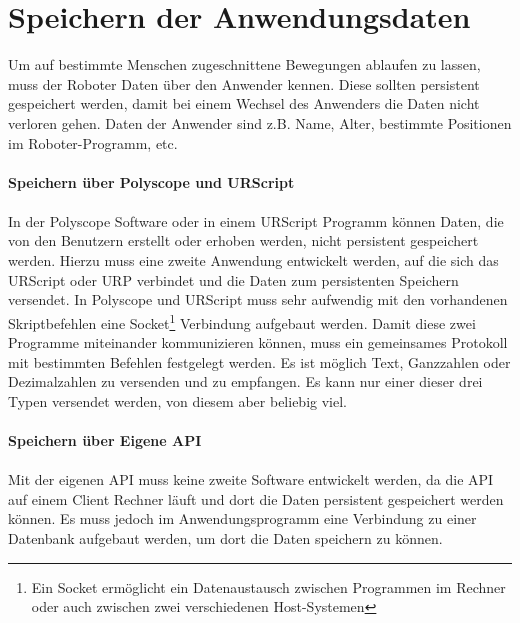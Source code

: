 \section{Speichern der Anwendungsdaten}
\label{sec:save_of_data_kon}

Um auf bestimmte Menschen zugeschnittene Bewegungen ablaufen zu lassen, muss der Roboter Daten über den Anwender kennen. Diese sollten persistent gespeichert werden, damit bei einem Wechsel des Anwenders die Daten nicht verloren gehen.
Daten der Anwender sind z.B. Name, Alter, bestimmte Positionen im Roboter-Programm, etc.
\\\\
\textbf{Speichern über Polyscope und URScript}
\label{sec:save_data_polyscope_kon}
\\\\
In der Polyscope Software oder in einem URScript Programm können Daten, die von den Benutzern erstellt oder erhoben werden, nicht persistent
gespeichert werden. Hierzu muss eine zweite Anwendung entwickelt werden, auf die sich das URScript oder \ac{URP} verbindet und die Daten zum persistenten Speichern versendet.
In Polyscope und URScript muss sehr aufwendig mit den vorhandenen Skriptbefehlen eine Socket\footnote{Ein Socket ermöglicht ein Datenaustausch zwischen Programmen im Rechner oder auch zwischen zwei verschiedenen Host-Systemen} Verbindung aufgebaut werden.
Damit diese zwei Programme miteinander kommunizieren können, muss ein gemeinsames Protokoll mit bestimmten Befehlen festgelegt werden. Es ist möglich Text, Ganzzahlen oder Dezimalzahlen zu versenden und zu empfangen. Es kann nur einer dieser drei Typen versendet werden, von diesem aber beliebig viel.
\\\\
\textbf{Speichern über Eigene API}
\label{save_data_own_api_kon}
\\\\
Mit der eigenen API muss keine zweite Software entwickelt werden, da die API auf einem Client Rechner läuft und dort die Daten persistent gespeichert werden können. Es muss jedoch im Anwendungsprogramm eine Verbindung zu einer Datenbank aufgebaut werden, um dort die Daten speichern zu können.
